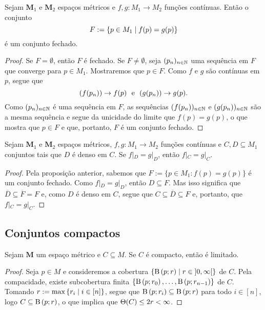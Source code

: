 \begin{proposition}
	Sejam $\bm M_1$ e $\bm M_2$ espaços métricos e $f,g\colon M_1 \to M_2$ funções contínuas. Então o conjunto
	\begin{equation*}
	F := \left\{ p \in M_1 \;\middle\vert\; f(p)=g(p) \right\}
	\end{equation*}
é um conjunto fechado.
\end{proposition}
\begin{proof}
	Se $F=\emptyset$, então $F$ é fechado. Se $F \neq \emptyset$, seja $(p_n)_{n \in \mathbb{N}}$ uma sequência em $F$ que converge para $p \in M_1$. Mostraremos que $p \in F$. Como $f$ e $g$ são contínuas em $p$, segue que
	\begin{equation*}
	(f(p_n)) \conv f(p) \text{\ \ e\ \ } (g(p_n)) \conv g(p).
	\end{equation*}
	Como $(p_n)_{n \in \mathbb{N}}$ é uma sequência em $F$, as sequências $(f(p_n))_{n \in \mathbb{N}}$ e $(g(p_n))_{n \in \mathbb{N}}$ são a mesma sequência e segue da unicidade do limite que $f(p)=g(p)$, o que mostra que $p \in F$ e que, portanto, $F$ é um conjunto fechado.
\end{proof}

\begin{proposition}
	Sejam $\bm M_1$ e $\bm M_2$ espaços métricos, $f,g: M_1 \to M_2$ funções contínuas e $C,D \subseteq M_1$ conjuntos tais que $D$ é denso em $C$. Se $f|_D = g|_D$, então $f|_C = g|_C$.
\end{proposition}
\begin{proof}
	Pela proposição anterior, sabemos que $F := \{p \in M_1 : f(p)=g(p)\}$ é um conjunto fechado. Como $f|_D = g|_D$, então $D \subseteq F$. Mas isso significa que $\overline D \subseteq \overline F = F$ e, como $D$ é denso em $C$, segue que $C \subseteq \overline D \subseteq F$ e, portanto, que $f|_C = g|_C$.
\end{proof}

\subsection{Conjuntos compactos}

\begin{proposition}
Sejam $\bm M$ um espaço métrico e $C \subseteq M$. Se $C$ é compacto, então é limitado.
\end{proposition}
\begin{proof}
Seja $p \in M$ e consideremos a cobertura $\left\{ \mathrm{B}\left(p; r\right) \;\middle\vert\; r \in \left]0,\allowbreak \infty\right[ \right\}$ de $C$. Pela compacidade, existe subcobertura finita $\{\mathrm{B}\left(p; r_0\right),\ldots,\mathrm{B}\left(p; r_{n-1}\right)\}$ de $C$. Tomando $r := \max\left\{ r_i \;\middle\vert\; i \in [n] \right\}$, segue que $\mathrm{B}\left(p; r_i\right) \subseteq \mathrm{B}\left(p; r\right)$ para todo $i \in [n]$, logo $C \subseteq \mathrm{B}\left(p; r\right)$, o que implica que $\Theta(C) \leq 2r < \infty$.
\end{proof}

